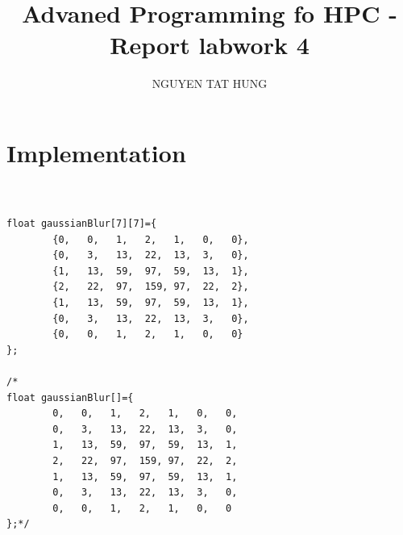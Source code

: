 \documentclass{article}
\title{Advaned Programming fo HPC - Report labwork 4}
\author{NGUYEN TAT HUNG}
\begin{document}
\maketitle

\section*{Implementation}
\begin{lstlisting}


float gaussianBlur[7][7]={
        {0,   0,   1,   2,   1,   0,   0},
        {0,   3,   13,  22,  13,  3,   0},
        {1,   13,  59,  97,  59,  13,  1},
        {2,   22,  97,  159, 97,  22,  2},
        {1,   13,  59,  97,  59,  13,  1},
        {0,   3,   13,  22,  13,  3,   0},
        {0,   0,   1,   2,   1,   0,   0}
};

/*
float gaussianBlur[]={
        0,   0,   1,   2,   1,   0,   0,
        0,   3,   13,  22,  13,  3,   0,
        1,   13,  59,  97,  59,  13,  1,
        2,   22,  97,  159, 97,  22,  2,
        1,   13,  59,  97,  59,  13,  1,
        0,   3,   13,  22,  13,  3,   0,
        0,   0,   1,   2,   1,   0,   0
};*/


\end{lstlisting}
\end{document}
